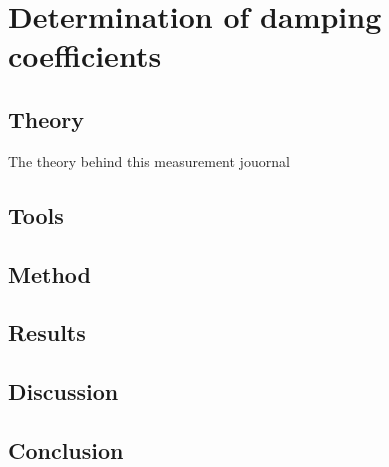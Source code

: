 \chapter{Determination of damping coefficients}
\label{app:damping}

\section{Theory}
The theory behind this measurement jouornal 

\section{Tools}

\section{Method}

\section{Results}

\section{Discussion}

\section{Conclusion}
